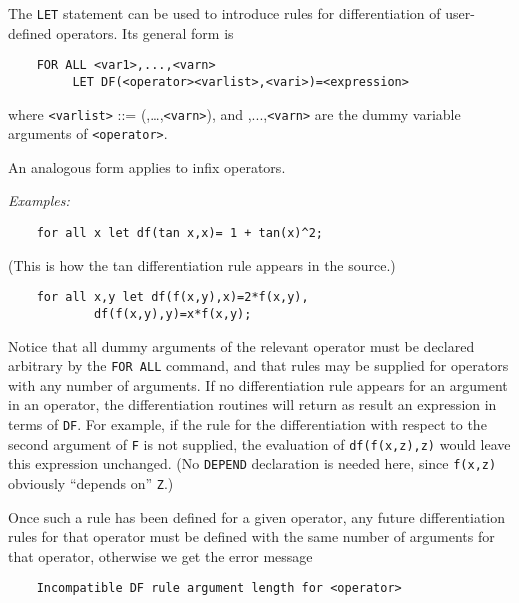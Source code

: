 The {\tt LET} statement can be used to introduce
rules for differentiation of user-defined operators.  Its general form is
\begin{verbatim}
	FOR ALL <var1>,...,<varn>
	     LET DF(<operator><varlist>,<vari>)=<expression>
\end{verbatim}
where {\tt <varlist>} ::= ({\tt <var1>},\dots,{\tt <varn>}), and
{\tt <var1>},...,{\tt <varn>} are the dummy variable arguments of
{\tt <operator>}.

An analogous form applies to infix operators.

{\it Examples:}
\begin{verbatim}
	for all x let df(tan x,x)= 1 + tan(x)^2;
\end{verbatim}
(This is how the tan differentiation rule appears in the {\REDUCE}
source.)
\begin{verbatim}
	for all x,y let df(f(x,y),x)=2*f(x,y),
			df(f(x,y),y)=x*f(x,y);
\end{verbatim}
Notice that all dummy arguments of the relevant operator must be declared
arbitrary by the {\tt FOR ALL} command, and that rules may be supplied for
operators with any number of arguments.  If no differentiation rule
appears for an argument in an operator, the differentiation routines will
return as result an expression in terms of {\tt DF}.  For
example, if the rule for the differentiation with respect to the second
argument of {\tt F} is not supplied, the evaluation of {\tt df(f(x,z),z)}
would leave this expression unchanged. (No {\tt DEPEND} declaration
is needed here, since {\tt f(x,z)} obviously ``depends on'' {\tt Z}.)

Once such a rule has been defined for a given operator, any future
differentiation rules for that operator must be
defined with the same number of arguments for that operator, otherwise we
get the error message
\begin{verbatim}
	Incompatible DF rule argument length for <operator>
\end{verbatim}

